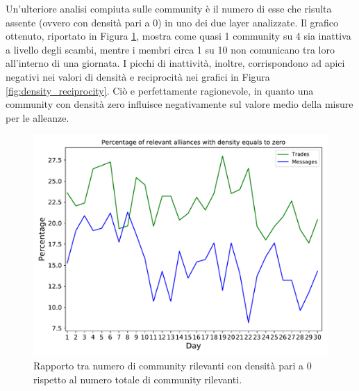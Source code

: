 Un'ulteriore analisi compiuta sulle community è il numero di esse che risulta assente (ovvero con densità pari a 0) in uno dei due layer analizzate. Il grafico ottenuto, riportato in Figura \ref{fig:densityzeroper}, mostra come quasi 1 community su 4 sia inattiva a livello degli scambi, mentre i membri circa 1 su 10 non comunicano tra loro all'interno di una giornata. I picchi di inattività, inoltre, corrispondono ad apici negativi nei valori di densità e reciprocità nei grafici in Figura \ref{fig:density_reciprocity}. Ciò e perfettamente ragionevole, in quanto una community con densità zero influisce negativamente sul valore medio della misure per le alleanze.
\begin{figure}
	\centering
	\includegraphics[width=0.9\linewidth]{images/Community/Density_Reciprocity/density_zero_per}
	\caption{Rapporto tra numero di community rilevanti con densità pari a 0 rispetto al numero totale di community rilevanti.}
	\label{fig:densityzeroper}
\end{figure}


